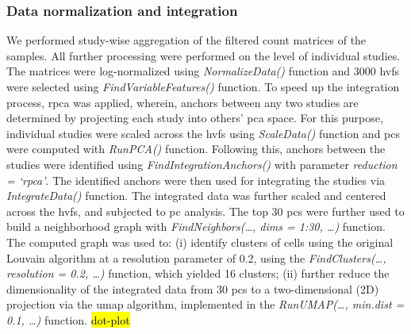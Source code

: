 \subsubsection{\large Data normalization and integration}
We performed study-wise aggregation of the filtered count matrices of the samples. All further processing were performed on the level of individual studies. The matrices were log-normalized using \textit{NormalizeData()} function and 3000 \glspl{hvf} were selected using \textit{FindVariableFeatures()} function. To speed up the integration process, \gls{rpca} was applied, wherein, anchors between any two studies are determined by projecting each study into others’ \gls{pca} space. For this purpose, individual studies were scaled across the \glspl{hvf} using \textit{ScaleData()} function and \glspl{pc} were computed with \textit{RunPCA()} function. Following this, anchors between the studies were identified using \textit{FindIntegrationAnchors()} with parameter \textit{reduction = ‘rpca’}. The identified anchors were then used for integrating the studies via \textit{IntegrateData()} function. The integrated data was further scaled and centered across the \glspl{hvf}, and subjected to \gls{pc} analysis. The top 30 \glspl{pc} were further used to build a neighborhood graph with \textit{FindNeighbors(…, dims = 1:30, …)} function. The computed graph was used to: (i) identify clusters of cells using the original Louvain algorithm at a resolution parameter of 0.2, using the \textit{FindClusters(…, resolution = 0.2, …)} function, which yielded 16 clusters; (ii) further reduce the dimensionality of the integrated data from 30 \glspl{pc} to a two-dimensional (2D) projection via the \gls{umap} algorithm, implemented in the \textit{RunUMAP(…, min.dist = 0.1, …)} function. \hl{dot-plot}

